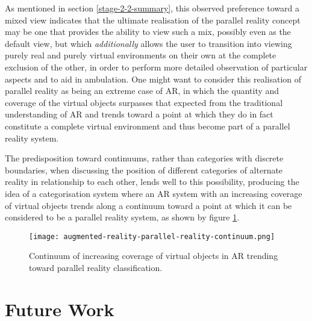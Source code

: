 As mentioned in section \ref{stage-2-2-summary}, this observed preference toward a mixed view indicates that the ultimate realisation of the parallel reality concept may be one that provides the ability to view such a mix, possibly even as the default view, but which \textit{additionally} allows the user to transition into viewing purely real and purely virtual environments on their own at the complete exclusion of the other, in order to perform more detailed observation of particular aspects and to aid in ambulation. One might want to consider this realisation of parallel reality as being an extreme case of AR, in which the quantity and coverage of the virtual objects surpasses that expected from the traditional understanding of AR and trends toward a point at which they do in fact constitute a complete virtual environment and thus become part of a parallel reality system.

The predisposition toward continuums, rather than categories with discrete boundaries, when discussing the position of different categories of alternate reality in relationship to each other, lends well to this possibility, producing the idea of a categorisation system where an AR system with an increasing coverage of virtual objects trends along a continuum toward a point at which it can be considered to be a parallel reality system, as shown by figure \ref{augmented-reality-parallel-reality-continuum.png}.

\begin{figure}[h]
	\begin{center}
		\texttt{[image: augmented-reality-parallel-reality-continuum.png]}
		\caption{Continuum of increasing coverage of virtual objects in AR trending toward parallel reality classification.}
		\label{augmented-reality-parallel-reality-continuum.png}
	\end{center}	
\end{figure}



\section{Future Work}

